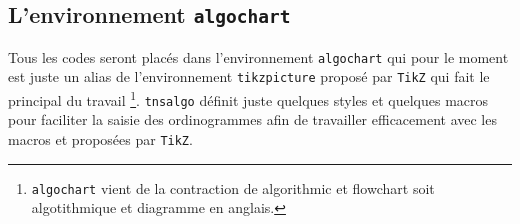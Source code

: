 \documentclass[12pt,a4paper]{article}
\begin{document}

\subsection{L'environnement \texttt{algochart}}

Tous les codes seront placés dans l'environnement \verb+algochart+ qui pour le moment est juste un alias de l'environnement \verb+tikzpicture+ proposé par \verb+TikZ+ qui fait le principal du travail
\footnote{
	\texttt{algochart} vient de la contraction de \og algorithmic \fg{} et \og flowchart \fg{} soit \og algotithmique \fg{} et \og diagramme \fg{} en anglais.
}.
\verb#tnsalgo# définit juste quelques styles et quelques macros pour faciliter la saisie des ordinogrammes afin de travailler efficacement avec les macros  et  proposées par \verb#TikZ#.
\end{document}
